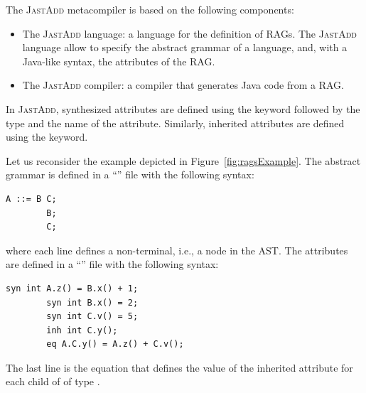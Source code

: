 The \textsc{JastAdd} metacompiler is based on the following components:
\begin{itemize}
    \item The \textsc{JastAdd} language: a language for the definition of RAGs.
    The \textsc{JastAdd} language allow to specify the abstract grammar of a language, and,
    with a Java-like syntax, the attributes of the RAG.
    \item The \textsc{JastAdd} compiler: a compiler that generates Java code from a RAG.
\end{itemize}
In \textsc{JastAdd}, synthesized attributes are defined using the  keyword followed
by the type and the name of the attribute. Similarly, inherited attributes are defined
using the  keyword. 

Let us reconsider the example depicted in Figure~\ref{fig:ragsExample}.
The abstract grammar is defined in a ``'' file with the following syntax:
    \begin{lstlisting}[language=JastAdd]
        A ::= B C;
        B;
        C;
    \end{lstlisting}
where each line defines a non-terminal, i.e., a node in the AST.
The attributes are defined in a ``'' file with the following syntax:
    \begin{lstlisting}[language=JastAdd]
        syn int A.z() = B.x() + 1;
        syn int B.x() = 2;
        syn int C.v() = 5;
        inh int C.y();
        eq A.C.y() = A.z() + C.v();
    \end{lstlisting}
The last line is the equation that defines the value of the inherited attribute  for each child of  of type .
